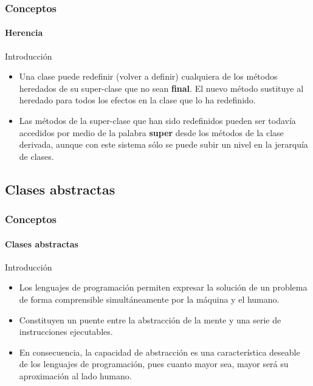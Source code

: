 \documentclass{beamer}
\begin{document}
		\begin{frame}
			\frametitle{Conceptos}
			\framesubtitle{Herencia}

			\begin{block}{Introducci\'on}
				\begin{itemize}
  					\item Una clase puede redefinir (volver a definir) cualquiera de los m\'etodos heredados de su super-clase que no sean \textbf{final}. El nuevo m\'etodo sustituye al heredado para todos los efectos en la clase que lo ha redefinido.
					\item Las m\'etodos de la super-clase que han sido redefinidos pueden ser todav\'ia accedidos por medio de la palabra \textbf{super} desde los m\'etodos de la clase derivada, aunque con este sistema s\'olo se puede subir un nivel en la jerarqu\'ia de clases.
				\end{itemize}
			\end{block}
		\end{frame}

		\subsection{Clases abstractas}

		\begin{frame}
			\frametitle{Conceptos}
			\framesubtitle{Clases abstractas}

			\begin{block}{Introducci\'on}
				\begin{itemize}
  					\item Los lenguajes de programaci\'on permiten expresar la soluci\'on de un problema de forma comprensible simult\'aneamente por la m\'aquina y el humano.
					\item Constituyen un puente entre la abstracci\'on de la mente y una serie de instrucciones ejecutables.
					\item En consecuencia, la capacidad de abstracci\'on es una caracter\'istica deseable de los lenguajes de programaci\'on, pues cuanto mayor sea, mayor ser\'a su aproximaci\'on al lado humano.
				\end{itemize}
			\end{block}
		\end{frame}
\end{document}
